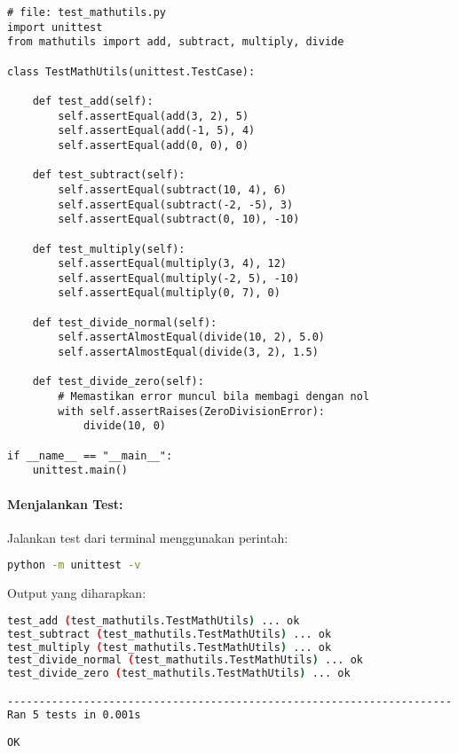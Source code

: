 \begin{lstlisting}[style=PythonStyle, caption={Pengujian fungsi matematika menggunakan unittest}, label={lst:test-mathutils}]
# file: test_mathutils.py
import unittest
from mathutils import add, subtract, multiply, divide

class TestMathUtils(unittest.TestCase):

    def test_add(self):
        self.assertEqual(add(3, 2), 5)
        self.assertEqual(add(-1, 5), 4)
        self.assertEqual(add(0, 0), 0)

    def test_subtract(self):
        self.assertEqual(subtract(10, 4), 6)
        self.assertEqual(subtract(-2, -5), 3)
        self.assertEqual(subtract(0, 10), -10)

    def test_multiply(self):
        self.assertEqual(multiply(3, 4), 12)
        self.assertEqual(multiply(-2, 5), -10)
        self.assertEqual(multiply(0, 7), 0)

    def test_divide_normal(self):
        self.assertAlmostEqual(divide(10, 2), 5.0)
        self.assertAlmostEqual(divide(3, 2), 1.5)

    def test_divide_zero(self):
        # Memastikan error muncul bila membagi dengan nol
        with self.assertRaises(ZeroDivisionError):
            divide(10, 0)

if __name__ == "__main__":
    unittest.main()
\end{lstlisting}

\paragraph{Menjalankan Test:}
Jalankan test dari terminal menggunakan perintah:

\begin{lstlisting}[language=bash]
python -m unittest -v
\end{lstlisting}

Output yang diharapkan:

\begin{lstlisting}[language=bash]
test_add (test_mathutils.TestMathUtils) ... ok
test_subtract (test_mathutils.TestMathUtils) ... ok
test_multiply (test_mathutils.TestMathUtils) ... ok
test_divide_normal (test_mathutils.TestMathUtils) ... ok
test_divide_zero (test_mathutils.TestMathUtils) ... ok

----------------------------------------------------------------------
Ran 5 tests in 0.001s

OK
\end{lstlisting}

